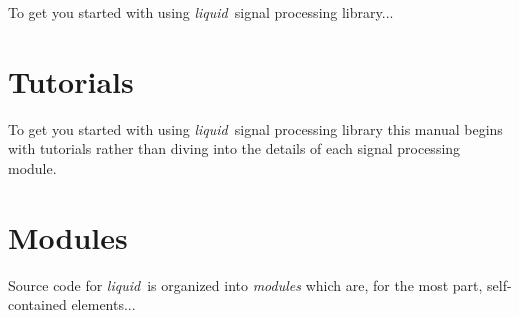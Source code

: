 \documentclass[11pt,twoside]{article}
\newcommand{\liquid}{{\it liquid}}
\begin{document}
\bigskip
\noindent
To get you started with using \liquid\ signal processing library...






%
%
\newpage
\part{Tutorials}
\label{part:tutorials}

\bigskip
\noindent
To get you started with using \liquid\ signal processing library
this manual begins with tutorials rather than diving into the details of
each signal processing module.



%


%
%
\newpage
\part{Modules}
\label{part:modules}

\bigskip
\noindent
Source code for \liquid\ is organized into {\em modules} which are, for
the most part, self-contained elements...




%






















%
%
\end{document}
